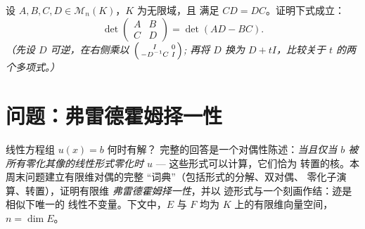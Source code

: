 \begin{exercise}[$\star\star\star$]\label{exo:b2:linalg:12}
设 $A, B, C, D \in \mathcal{M}_n(K)$，$K$ 为无限域，且
满足 $CD = DC$。证明下式成立：
\[
\det\begin{pmatrix} A & B\\ C & D\end{pmatrix}
= \det(AD - BC).
\]
\emph{（先设 $D$ 可逆，在右侧乘以
$\begin{psmallmatrix} I & 0\\ -D^{-1}C & I\end{psmallmatrix}$;
再将 $D$ 换为 $D + tI$，比较关于 $t$ 的两个多项式。）}
\end{exercise}

\section{问题：弗雷德霍姆择一性}

线性方程组 $u(x) = b$ 何时有解？
完整的回答是一个对偶性陈述：\emph{当且仅当 $b$ 被
所有零化其像的线性形式零化时
$u$} --- 这些形式可以计算，它们恰为
转置的核。本周末问题建立有限维对偶的完整
“词典”（包括形式的分解、双对偶、
零化子演算、转置），证明有限维
\emph{弗雷德霍姆择一性}，并以
迹形式与一个刻画作结：迹是相似下唯一的
线性不变量。下文中，$E$ 与 $F$ 均为
$K$ 上的有限维向量空间，$n = \dim E$。

